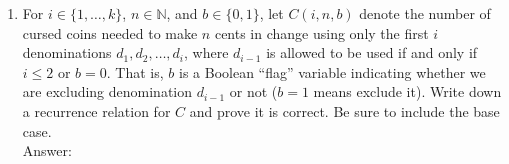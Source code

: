 \documentclass[12pt]{article}
\begin{document}
\begin{enumerate}
    \begin{enumerate}
        \item 
        
        For $i \in \{1,\dotsc,k\}$, $n \in \mathbb{N}$, and $b \in \{0,1\}$, let $C(i,n,b)$ denote the number of cursed coins needed to make $n$ cents in change using only the first $i$ denominations $d_1, d_2, \dotsc, d_i$, where $d_{i-1}$ is allowed to be used if and only if $i \leq 2$ or $b=0$. That is, $b$ is a Boolean ``flag'' variable indicating whether we are excluding denomination $d_{i-1}$ or not ($b=1$ means exclude it). 	
    	Write down a recurrence relation for $C$ and prove it is correct. Be sure to include the base case.\\
        
        Answer:\\
    

\end{enumerate}
\end{enumerate}
\end{document}
